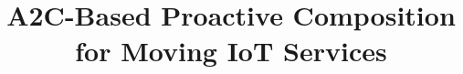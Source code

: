 \documentclass[10pt,twocolumn]{article}
\author{}
\date{}
\begin{document}
\title{A2C-Based Proactive Composition for Moving IoT Services}

\maketitle












\end{document}
